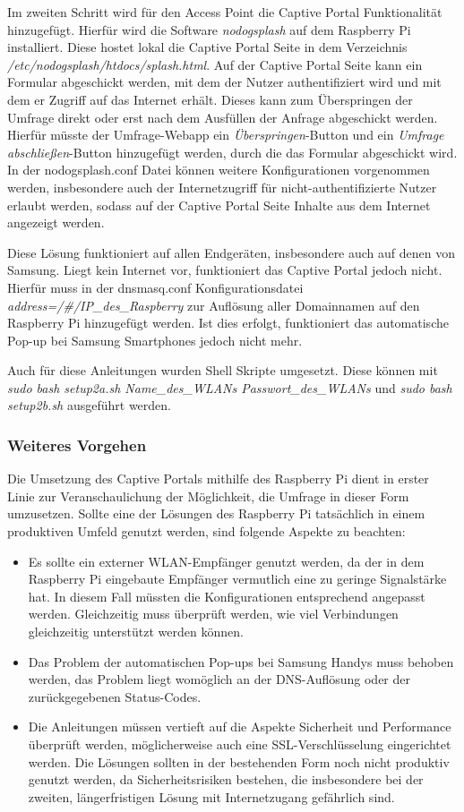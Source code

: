 Im zweiten Schritt wird für den Access Point die Captive Portal Funktionalität hinzugefügt. Hierfür wird die Software \textit{nodogsplash} auf dem Raspberry Pi installiert. Diese hostet lokal die Captive Portal Seite in dem Verzeichnis \textit{/etc/nodogsplash/htdocs/splash.html}. Auf der Captive Portal Seite kann ein Formular abgeschickt werden, mit dem der Nutzer authentifiziert wird und mit dem er Zugriff auf das Internet erhält. Dieses kann zum Überspringen der Umfrage direkt oder erst nach dem Ausfüllen der Anfrage abgeschickt werden. Hierfür müsste der Umfrage-Webapp ein \textit{Überspringen}-Button und ein \textit{Umfrage abschließen}-Button hinzugefügt werden, durch die das Formular abgeschickt wird. In der nodogsplash.conf Datei können weitere Konfigurationen vorgenommen werden, insbesondere auch der Internetzugriff für nicht-authentifizierte Nutzer erlaubt werden, sodass auf der Captive Portal Seite Inhalte aus dem Internet angezeigt werden.

Diese Lösung funktioniert auf allen Endgeräten, insbesondere auch auf denen von Samsung. Liegt kein Internet vor, funktioniert das Captive Portal jedoch nicht. Hierfür muss in der dnsmasq.conf Konfigurationsdatei \textit{address=/\#/IP\_des\_Raspberry} zur Auflösung aller Domainnamen auf den Raspberry Pi hinzugefügt werden. Ist dies erfolgt, funktioniert das automatische Pop-up bei Samsung Smartphones jedoch nicht mehr.

Auch für diese Anleitungen wurden Shell Skripte umgesetzt. Diese können mit \textit{sudo bash setup2a.sh Name\_des\_WLANs Passwort\_des\_WLANs} und \textit{sudo bash setup2b.sh} ausgeführt werden.

\subsubsection*{Weiteres Vorgehen}
Die Umsetzung des Captive Portals mithilfe des Raspberry Pi dient in erster Linie zur Veranschaulichung der Möglichkeit, die Umfrage in dieser Form umzusetzen. Sollte eine der Lösungen des Raspberry Pi tatsächlich in einem produktiven Umfeld genutzt werden, sind folgende Aspekte zu beachten:
\begin{itemize}
\item Es sollte ein externer WLAN-Empfänger genutzt werden, da der in dem Raspberry Pi eingebaute Empfänger vermutlich eine zu geringe Signalstärke hat. In diesem Fall müssten die Konfigurationen entsprechend angepasst werden. Gleichzeitig muss überprüft werden, wie viel Verbindungen gleichzeitig unterstützt werden können.
\item Das Problem der automatischen Pop-ups bei Samsung Handys muss behoben werden, das Problem liegt womöglich an der DNS-Auflösung oder der zurückgegebenen Status-Codes.
\item Die Anleitungen müssen vertieft auf die Aspekte Sicherheit und Performance überprüft werden, möglicherweise auch eine SSL-Verschlüsselung eingerichtet werden. Die Lösungen sollten in der bestehenden Form noch nicht produktiv genutzt werden, da Sicherheitsrisiken bestehen, die insbesondere bei der zweiten, längerfristigen Lösung mit Internetzugang gefährlich sind.

\end{itemize}

